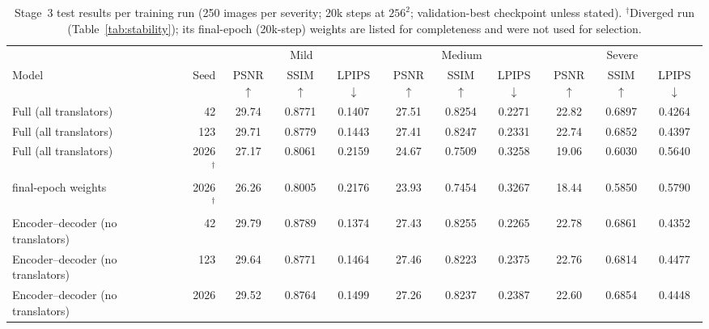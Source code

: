 \begin{table}[t]
\centering
\caption{Stage~3 test results per training run (250 images per severity; 20k steps at $256^2$; validation-best checkpoint unless stated). $^\dagger$Diverged run (Table~\ref{tab:stability}); its final-epoch (20k-step) weights are listed for completeness and were not used for selection.}
\label{tab:convergence}
\setlength{\tabcolsep}{4pt}
\begin{tabular}{lrccccccccc}
\toprule
 & & \multicolumn{3}{c}{Mild} & \multicolumn{3}{c}{Medium} & \multicolumn{3}{c}{Severe} \\
\cmidrule(lr){3-5}\cmidrule(lr){6-8}\cmidrule(lr){9-11}
Model & Seed & PSNR$\uparrow$ & SSIM$\uparrow$ & LPIPS$\downarrow$ & PSNR$\uparrow$ & SSIM$\uparrow$ & LPIPS$\downarrow$ & PSNR$\uparrow$ & SSIM$\uparrow$ & LPIPS$\downarrow$ \\
\midrule
Full (all translators) & 42 & 29.74 & 0.8771 & 0.1407 & 27.51 & 0.8254 & 0.2271 & 22.82 & 0.6897 & 0.4264 \\
Full (all translators) & 123 & 29.71 & 0.8779 & 0.1443 & 27.41 & 0.8247 & 0.2331 & 22.74 & 0.6852 & 0.4397 \\
Full (all translators) & 2026$^\dagger$ & 27.17 & 0.8061 & 0.2159 & 24.67 & 0.7509 & 0.3258 & 19.06 & 0.6030 & 0.5640 \\
\quad final-epoch weights & 2026$^\dagger$ & 26.26 & 0.8005 & 0.2176 & 23.93 & 0.7454 & 0.3267 & 18.44 & 0.5850 & 0.5790 \\
\midrule
Encoder--decoder (no translators) & 42 & 29.79 & 0.8789 & 0.1374 & 27.43 & 0.8255 & 0.2265 & 22.78 & 0.6861 & 0.4352 \\
Encoder--decoder (no translators) & 123 & 29.64 & 0.8771 & 0.1464 & 27.46 & 0.8223 & 0.2375 & 22.76 & 0.6814 & 0.4477 \\
Encoder--decoder (no translators) & 2026 & 29.52 & 0.8764 & 0.1499 & 27.26 & 0.8237 & 0.2387 & 22.60 & 0.6854 & 0.4448 \\
\bottomrule
\end{tabular}
\end{table}
